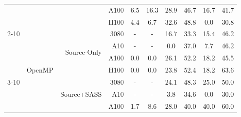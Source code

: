 \begin{table}[]
{\begin{tabular}{@{}rrrrcc|cc|cc@{}}
 &  &  & A100 & \cellcolor[rgb]{1.000,0.987,0.987}6.5 & \cellcolor[rgb]{1.000,0.945,0.945}16.3 & \cellcolor[rgb]{1.000,0.863,0.863}28.9 & \cellcolor[rgb]{1.000,0.704,0.704}46.7 & \cellcolor[rgb]{1.000,0.943,0.943}16.7 & \cellcolor[rgb]{1.000,0.753,0.753}41.7 \\
 &  &  & H100 & \cellcolor[rgb]{1.000,0.993,0.993}4.4 & \cellcolor[rgb]{1.000,0.987,0.987}6.7 & \cellcolor[rgb]{1.000,0.834,0.834}32.6 & \cellcolor[rgb]{1.000,0.683,0.683}48.8 & \cellcolor[rgb]{1.000,1.000,1.000}0.0 & \cellcolor[rgb]{1.000,0.848,0.848}30.8 \\
\cmidrule(lr){2-10}
 & \multirow{8}{*}{OpenMP} & \multirow{4}{*}{Source-Only} & 3080 & \cellcolor[rgb]{1.000,1.000,1.000}- & \cellcolor[rgb]{1.000,1.000,1.000}- & \cellcolor[rgb]{1.000,0.943,0.943}16.7 & \cellcolor[rgb]{1.000,0.828,0.828}33.3 & \cellcolor[rgb]{1.000,0.950,0.950}15.4 & \cellcolor[rgb]{1.000,0.709,0.709}46.2 \\
 &  &  & A10 & \cellcolor[rgb]{1.000,1.000,1.000}- & \cellcolor[rgb]{1.000,1.000,1.000}- & \cellcolor[rgb]{1.000,1.000,1.000}0.0 & \cellcolor[rgb]{1.000,0.796,0.796}37.0 & \cellcolor[rgb]{1.000,0.983,0.983}7.7 & \cellcolor[rgb]{1.000,0.709,0.709}46.2 \\
 &  &  & A100 & \cellcolor[rgb]{1.000,1.000,1.000}0.0 & \cellcolor[rgb]{1.000,1.000,1.000}0.0 & \cellcolor[rgb]{1.000,0.883,0.883}26.1 & \cellcolor[rgb]{1.000,0.647,0.647}52.2 & \cellcolor[rgb]{1.000,0.935,0.935}18.2 & \cellcolor[rgb]{1.000,0.716,0.716}45.5 \\
 &  &  & H100 & \cellcolor[rgb]{1.000,1.000,1.000}0.0 & \cellcolor[rgb]{1.000,1.000,1.000}0.0 & \cellcolor[rgb]{1.000,0.899,0.899}23.8 & \cellcolor[rgb]{1.000,0.644,0.644}52.4 & \cellcolor[rgb]{1.000,0.935,0.935}18.2 & \cellcolor[rgb]{1.000,0.515,0.515}63.6 \\
\cmidrule(lr){3-10}
 &  & \multirow{4}{*}{Source+SASS} & 3080 & \cellcolor[rgb]{1.000,1.000,1.000}- & \cellcolor[rgb]{1.000,1.000,1.000}- & \cellcolor[rgb]{1.000,0.897,0.897}24.1 & \cellcolor[rgb]{1.000,0.688,0.688}48.3 & \cellcolor[rgb]{1.000,0.891,0.891}25.0 & \cellcolor[rgb]{1.000,0.670,0.670}50.0 \\
 &  &  & A10 & \cellcolor[rgb]{1.000,1.000,1.000}- & \cellcolor[rgb]{1.000,1.000,1.000}- & \cellcolor[rgb]{1.000,0.995,0.995}3.8 & \cellcolor[rgb]{1.000,0.817,0.817}34.6 & \cellcolor[rgb]{1.000,1.000,1.000}0.0 & \cellcolor[rgb]{1.000,0.854,0.854}30.0 \\
 &  &  & A100 & \cellcolor[rgb]{1.000,0.999,0.999}1.7 & \cellcolor[rgb]{1.000,0.980,0.980}8.6 & \cellcolor[rgb]{1.000,0.870,0.870}28.0 & \cellcolor[rgb]{1.000,0.769,0.769}40.0 & \cellcolor[rgb]{1.000,0.769,0.769}40.0 & \cellcolor[rgb]{1.000,0.558,0.558}60.0 \\

\end{tabular}}
\end{table}
